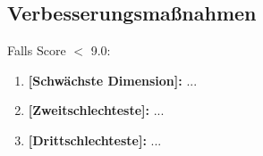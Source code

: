 \documentclass[11pt,a4paper]{article}
\begin{document}
\subsection{Verbesserungsmaßnahmen}

Falls Score $<$ 9.0:

\begin{enumerate}
    \item \textbf{[Schwächste Dimension]:} ...
    \item \textbf{[Zweitschlechteste]:} ...
    \item \textbf{[Drittschlechteste]:} ...
\end{enumerate}

\end{document}

